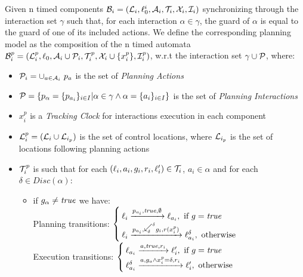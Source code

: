 

\begin{definition}
  \label{def:plan_aut}
  Given n timed components $\mathcal{B}_i=(\mathcal{L}_i,\ell_0^i,\mathcal{A}_i,\mathcal{T}_i,\mathcal{X}_i,\mathcal{I}_i)$ synchronizing 
  through the interaction set  $\gamma$ such that, for each interaction $\alpha\in\gamma$, 
  the guard of $\alpha$ is equal to the guard of one of its included actions.   
  We define the corresponding planning model as the composition of the n timed automata 
  $\mathcal{B}_i^p=(\mathcal{L}_i^p,\ell_0,\mathcal{A}_i\cup\mathcal{P}_i,\mathcal{T}_i^p,\mathcal{X}_i\cup\{x_i^p\},\mathcal{I}_i^p)$,
  w.r.t the interaction set $\gamma\cup\mathcal{P}$, where:
  \begin{itemize}
    \item $\tcal{P}_i=\cup_{a\in\A_i} \ p_{a}$ is the set of \emph{Planning Actions}
    \item $\mathcal{P}=\{p_{\alpha}=\{p_{a_i}\}_{i\in I}|\alpha\in\gamma\wedge\alpha=
      \{a_i\}_{i\in I}\}$ is the set of \emph{Planning Interactions}  
    \item $x_i^p$ is a \emph{Tracking Clock} for interactions execution in each component
    \item $\mathcal{L}_i^{p}=(\mathcal{L}_i\cup\mathcal{L}_{i_p})$ is the set of control locations, where 
      $\mathcal{L}_{i_p}$ is the set of locations following planning actions
    \item $\mathcal{T}_i^p$ is such that for each $(\ell_i,a_i,g_i,r_i,\ell'_i)\in\mathcal{T}_i$, $a_i\in\alpha$ 
      and for each
      $\delta\in Disc(\alpha)$:
      \begin{itemize}
        \item if $g_{\alpha}\neq\textnormal{\textit{true}}$ we have:\\
          Planning transitions: $\begin{cases}
            \loc_i\transit{p_{a_i},\true,\emptyset}\loc_{a_i}, \text{ if } g=\true\\
            \loc_i\transit{p_{a_i},\backwardp{\delta}{\delta} g_i,r(x_i^p)}\loc^{\delta}_{a_i}, 
          \text{ otherwise}\end{cases}$\\ 
          Execution transitions: $\begin{cases}
            \ell_{a_i}\xrightarrow{a,\textnormal{\textit{true}},r_i}\ell'_i, \text{ if } g=\textnormal{\textit{true}}\\
            \ell_{a_i}^{\delta}\xrightarrow{a,g_a\wedge x_i^p=\delta,r_i}\ell'_i, \text{ otherwise}
            \end{cases}$\\

\end{itemize}
\end{itemize}
\end{definition}
